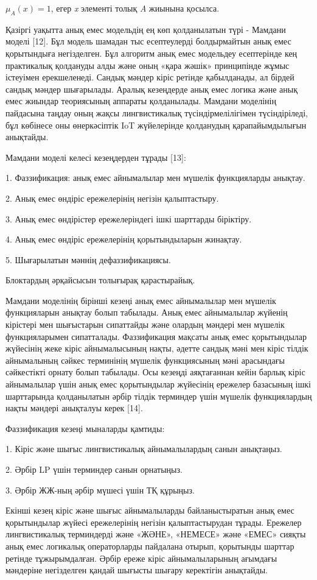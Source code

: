 \begin{multicols}{2}
\(\mu_{A}(x) = 1\), егер \emph{x} элементі толық \emph{A} жиынына
қосылса.

Қазіргі уақытта анық емес модельдің ең көп қолданылатын түрі - Мамдани
моделі {[}12{]}. Бұл модель шамадан тыс есептеулерді болдырмайтын анық
емес қорытындыға негізделген. Бұл алгоритм анық емес модельдеу
есептерінде кең практикалық қолдануды алды және оның «қара жәшік»
принципінде жұмыс істеуімен ерекшеленеді. Сандық мәндер кіріс ретінде
қабылданады, ал бірдей сандық мәндер шығарылады. Аралық кезеңдерде анық
емес логика және анық емес жиындар теориясының аппараты қолданылады.
Мамдани моделінің пайдасына таңдау оның жақсы лингвистикалық
түсіндірмелілігімен түсіндіріледі, бұл көбінесе оны өнеркәсіптік IoT
жүйелерінде қолданудың қарапайымдылығын анықтайды.

Мамдани моделі келесі кезеңдерден тұрады {[}13{]}:

1. Фаззификация: анық емес айнымалылар мен мүшелік функцияларды анықтау.

2. Анық емес өндіріс ережелерінің негізін қалыптастыру.

3. Анық емес өндірістер ережелеріндегі ішкі шарттарды біріктіру.

4. Анық емес өндіріс ережелерінің қорытындыларын жинақтау.

5. Шығарылатын мәннің дефаззификациясы.

Блоктардың әрқайсысын толығырақ қарастырайық.

Мамдани моделінің бірінші кезеңі анық емес айнымалылар мен мүшелік
функцияларын анықтау болып табылады. Анық емес айнымалылар жүйенің
кірістері мен шығыстарын сипаттайды және олардың мәндері мен мүшелік
функцияларымен сипатталады. Фаззификация мақсаты анық емес қорытындылар
жүйесінің жеке кіріс айнымалысының нақты, әдетте сандық мәні мен кіріс
тілдік айнымалының сәйкес терминінің мүшелік функциясының мәні
арасындағы сәйкестікті орнату болып табылады. Осы кезеңді аяқтағаннан
кейін барлық кіріс айнымалылар үшін анық емес қорытындылар жүйесінің
ережелер базасының ішкі шарттарында қолданылатын әрбір тілдік терминдер
үшін мүшелік функциялардың нақты мәндері анықталуы керек {[}14{]}.

Фаззификация кезеңі мыналарды қамтиды:

1. Кіріс және шығыс лингвистикалық айнымалылардың санын анықтаңыз.

2. Әрбір LP үшін терминдер санын орнатыңыз.

3. Әрбір ЖЖ-ның әрбір мүшесі үшін ТҚ құрыңыз.

Екінші кезең кіріс және шығыс айнымалыларды байланыстыратын анық емес
қорытындылар жүйесі ережелерінің негізін қалыптастырудан тұрады.
Ережелер лингвистикалық терминдерді және «ЖӘНЕ», «НЕМЕСЕ» және «ЕМЕС»
сияқты анық емес логикалық операторларды пайдалана отырып, қорытынды
шарттар ретінде тұжырымдалған. Әрбір ереже кіріс айнымалыларының
ағымдағы мәндеріне негізделген қандай шығысты шығару керектігін
анықтайды.


\end{multicols}
